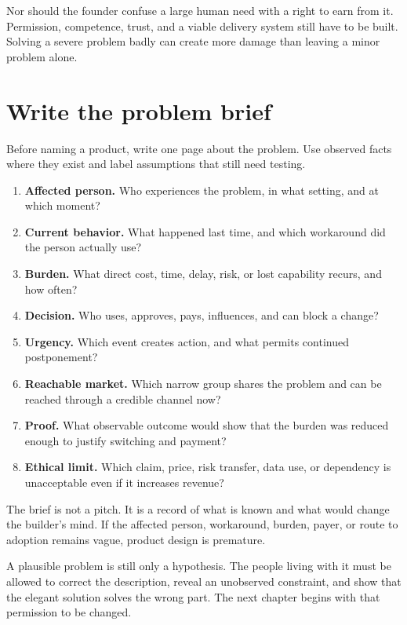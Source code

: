 Nor should the founder confuse a large human need with a right to earn from it.
Permission, competence, trust, and a viable delivery system still have to be
built. Solving a severe problem badly can create more damage than leaving a
minor problem alone.

\section{Write the problem brief}

Before naming a product, write one page about the problem. Use observed facts
where they exist and label assumptions that still need testing.

\begin{enumerate}[itemsep=0.25em]
\item \textbf{Affected person.} Who experiences the problem, in what setting,
  and at which moment?
\item \textbf{Current behavior.} What happened last time, and which workaround
  did the person actually use?
\item \textbf{Burden.} What direct cost, time, delay, risk, or lost capability
  recurs, and how often?
\item \textbf{Decision.} Who uses, approves, pays, influences, and can block a
  change?
\item \textbf{Urgency.} Which event creates action, and what permits continued
  postponement?
\item \textbf{Reachable market.} Which narrow group shares the problem and can
  be reached through a credible channel now?
\item \textbf{Proof.} What observable outcome would show that the burden was
  reduced enough to justify switching and payment?
\item \textbf{Ethical limit.} Which claim, price, risk transfer, data use, or
  dependency is unacceptable even if it increases revenue?
\end{enumerate}

\enlargethispage{4\baselineskip}
The brief is not a pitch. It is a record of what is known and what would change
the builder's mind. If the affected person, workaround, burden, payer, or route
to adoption remains vague, product design is premature.

A plausible problem is still only a hypothesis. The people living with it must
be allowed to correct the description, reveal an unobserved constraint, and
show that the elegant solution solves the wrong part. The next chapter begins
with that permission to be changed.
